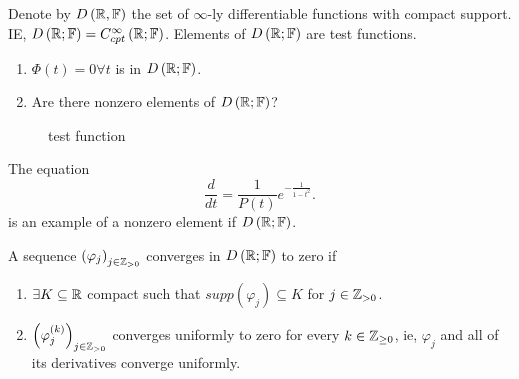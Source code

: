 \begin{definition}
	Denote by $D\left( \mathbb{R}, \mathbb{F} \right) $ the set of $\infty$-ly differentiable functions with compact support. IE, $D\left( \mathbb{R}; \mathbb{F} \right) = C^{\infty}_{cpt}\left( \mathbb{R}; \mathbb{F} \right) $. Elements of $D\left( \mathbb{R}; \mathbb{F} \right) $ are test functions. 
\end{definition}

\begin{example}
	\begin{enumerate}
		\item $\Phi\left( t \right) = 0 \forall  t $ is in $D\left( \mathbb{R};\mathbb{F} \right) $.
		\item Are there nonzero elements of $D\left( \mathbb{R}; \mathbb{F} \right) $?
			
	\end{enumerate}
\begin{figure}[ht]
    \centering
    \caption{test function}
    \label{fig:test-function}
\end{figure}

The equation
\[
	\frac{d}{dt} = \frac{1}{P\left( t \right) } e ^{-\frac{1}{1 - t^2}}
.\] 	
is an example of a nonzero element if $D\left( \mathbb{R};\mathbb{F} \right) $. 
\end{example}

\begin{definition}
	A sequence $\left( \varphi_{j} \right) _{j \in \mathbb{Z}_{>0}}$ converges in $D\left( \mathbb{R}; \mathbb{F} \right) $ to zero if 
	\begin{enumerate}
		\item $\exists K \subseteq \mathbb{R} $ compact such that $supp\left( \varphi_{j} \right) \subseteq K$ for $j \in  \mathbb{Z}_{>0}$. 
		\item $\left( \varphi_{j}^{\left( k \right) } \right) _{j \in  \mathbb{Z} _{>0}}$ converges uniformly to zero for every $k \in  \mathbb{Z}_{\ge 0}$, ie, $\varphi_{j}$ and all of its derivatives converge uniformly. 
	\end{enumerate}
\end{definition}
